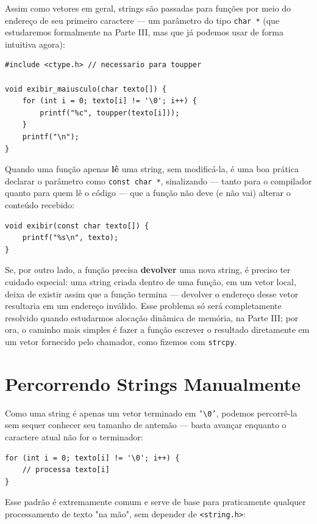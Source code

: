 \documentclass[12pt,a4paper,oneside]{extreport}
\begin{document}
Assim como vetores em geral, strings são passadas para funções por meio do endereço de seu primeiro caractere — um parâmetro do tipo \texttt{char *} (que estudaremos formalmente na Parte III, mas que já podemos usar de forma intuitiva agora):

\begin{lstlisting}
#include <ctype.h> // necessario para toupper

void exibir_maiusculo(char texto[]) {
    for (int i = 0; texto[i] != '\0'; i++) {
        printf("%c", toupper(texto[i]));
    }
    printf("\n");
}
\end{lstlisting}

Quando uma função apenas \textbf{lê} uma string, sem modificá-la, é uma boa prática declarar o parâmetro como \texttt{const char *}, sinalizando — tanto para o compilador quanto para quem lê o código — que a função não deve (e não vai) alterar o conteúdo recebido:

\begin{lstlisting}
void exibir(const char texto[]) {
    printf("%s\n", texto);
}
\end{lstlisting}

Se, por outro lado, a função precisa \textbf{devolver} uma nova string, é preciso ter cuidado especial: uma string criada dentro de uma função, em um vetor local, deixa de existir assim que a função termina — devolver o endereço desse vetor resultaria em um endereço inválido. Esse problema só será completamente resolvido quando estudarmos alocação dinâmica de memória, na Parte III; por ora, o caminho mais simples é fazer a função escrever o resultado diretamente em um vetor fornecido pelo chamador, como fizemos com \texttt{strcpy}.

\section{Percorrendo Strings Manualmente}

Como uma string é apenas um vetor terminado em \texttt{'\textbackslash 0'}, podemos percorrê-la sem sequer conhecer seu tamanho de antemão — basta avançar enquanto o caractere atual não for o terminador:

\begin{lstlisting}
for (int i = 0; texto[i] != '\0'; i++) {
    // processa texto[i]
}
\end{lstlisting}

Esse padrão é extremamente comum e serve de base para praticamente qualquer processamento de texto "na mão", sem depender de \texttt{<string.h>}:
\end{document}
